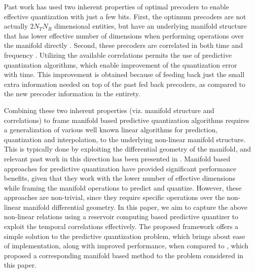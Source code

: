 \documentclass[conference]{IEEEtran}
\begin{document}
Past work has used two inherent properties of optimal precoders to enable effective quantization with just a few bits.
First, the optimum precoders are not actually $2N_TN_R$ dimensional entities, but have an underlying manifold structure that has lower effective number of dimensions when performing operations over the manifold directly \cite{pitaval2013codebooks}.
Second, these precoders are correlated in both time and frequency \cite{Gupt1905:Predictive}.
Utilizing the available correlations permits the use of predictive quantization algorithms, which enable improvement of the quantization error with time.
This improvement is obtained because of feeding back just the small extra information needed on top of the past fed back precoders, as compared to the new precoder information in the entirety.

Combining these two inherent properties (viz. manifold structure and correlations) to frame manifold based predictive quantization algorithms requires a generalization of various well known linear algorithms for prediction, quantization and interpolation, to the underlying non-linear manifold structure. This is typically done by exploiting the differential geometry of the manifold, and relevant past work in this direction has been presented in \cite{Gupt1905:Predictive,6891198,6545375,5671092,Li2016,krishnamachari2013geometry,chang2011adaptive}. Manifold based approaches for predictive quantization have provided significant performance benefits, given that they work with the lower number of effective dimensions while framing the manifold operations to predict and quantize.
However, these approaches are non-trivial, since they require specific operations over the non-linear manifold differential geometry.
In this paper, we aim to capture the above non-linear relations using a reservoir computing based predictive quantizer to exploit the temporal correlations effectively.
The proposed framework offers a simple solution to the predictive quantization problem, which brings about ease of implementation, along with improved performance, when compared to \cite{6891198}, which proposed a corresponding manifold based method to the problem considered in this paper.
\end{document}
